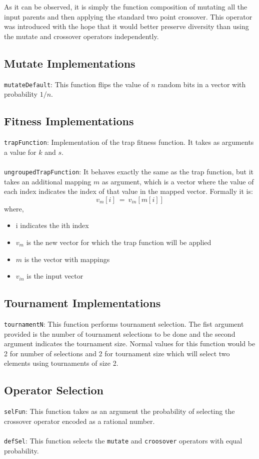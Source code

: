 \documentclass[10pt]{article}
\begin{document}
As it can be observed, it is simply the function composition of mutating all the input parents and then applying the standard two point crossover. This operator was introduced with the hope that it would better preserve diversity than using the mutate and crossover operators independently.

\subsection{Mutate Implementations}

\verb+mutateDefault+: This function flips the value of $n$ random bits in a vector with probability $1/n$.

\subsection{Fitness Implementations}

\verb+trapFunction+: Implementation of the trap fitness function. It takes as arguments a value for $k$ and $s$.
\\\\
\verb+ungroupedTrapFunction+: It behaves exactly the same as the trap function, but it takes an additional mapping $m$ as argument, which is a vector where the value of each index indicates the index of that value in the mapped vector. Formally it is:
\[
v_m[i]\ =\ v_{in}[m[i]]
\]
where,
\begin{itemize}
  \item i indicates the ith index
  \item $v_m$ is the new vector for which the trap function will be applied
  \item $m$ is the vector with mappings
  \item $v_{in}$ is the input vector
\end{itemize}

\subsection{Tournament Implementations}

\verb+tournamentN+: This function performs tournament selection. The fist argument provided is the number of tournament selections to be done and the second argument indicates the tournament size. Normal values for this function would be 2 for number of selections and 2 for tournament size which will select two elements using tournaments of size 2.

\subsection{Operator Selection}
\verb+selFun+: This function takes as an argument the probability of selecting the crossover operator encoded as a rational number.
\\\\
\verb+defSel+: This function selects the \verb+mutate+ and \verb+croosover+ operators with equal probability.
\end{document}
